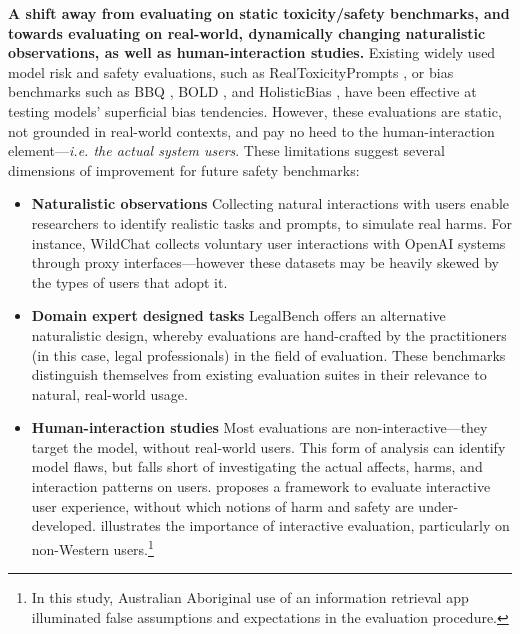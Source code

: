 \textbf{A shift away from evaluating on static toxicity/safety benchmarks, and towards evaluating on real-world, dynamically changing naturalistic observations, as well as human-interaction studies.}
Existing widely used model risk and safety evaluations, such as RealToxicityPrompts \citep{gehman2020realtoxicityprompts}, or bias benchmarks such as BBQ \citep{parrish2022bbq}, BOLD \citep{dhamala2021bold}, and HolisticBias \citep{smith2022m}, have been effective at  testing models' superficial bias tendencies.
However, these evaluations are static, not grounded in real-world contexts, and pay no heed to the human-interaction element---\textit{i.e. the actual system users}.
These limitations suggest several dimensions of improvement for future safety benchmarks:
\begin{itemize}
    \item \textbf{Naturalistic observations} Collecting natural interactions with users enable researchers to identify realistic tasks and prompts, to simulate real harms. For instance, WildChat \citep{zhao2023inthe} collects voluntary user interactions with OpenAI systems through proxy interfaces---however these datasets may be heavily skewed by the types of users that adopt it.
    \item \textbf{Domain expert designed tasks} LegalBench \citep{guha2024legalbench} offers an alternative naturalistic design, whereby evaluations are hand-crafted by the practitioners (in this case, legal professionals) in the field of evaluation. These benchmarks distinguish themselves from existing evaluation suites in their relevance to natural, real-world usage.
    \item \textbf{Human-interaction studies} Most evaluations are non-interactive---they target the model, without real-world users. This form of analysis can identify model flaws, but falls short of investigating the actual affects, harms, and interaction patterns on users. \citet{lee2023evaluating} proposes a framework to evaluate interactive user experience, without which notions of harm and safety are under-developed.
    \citet{le2022learning} illustrates the importance of interactive evaluation, particularly on non-Western users.\footnote{In this study, Australian Aboriginal use of an information retrieval app illuminated false assumptions and expectations in the evaluation procedure.} 
    
\end{itemize}
